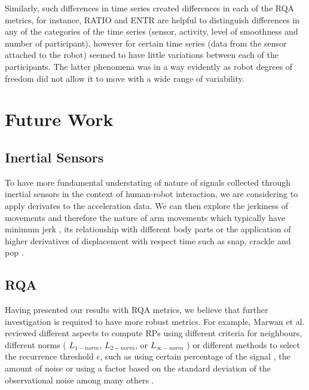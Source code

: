 %
%

Similarly, such differences in time series created differences in each of the 
RQA metrics, for instance, RATIO and ENTR are helpful to distinguish 
differences in any of the categories of the time series (sensor, activity, 
level of smoothness and number of participant), however for certain time series 
(data from the sensor attached to the robot) seemed to have little variations 
between each of the participants. The latter phenomena was in a way evidently
as robot degrees of freedom did not allow it to move with a wide range of variability. 





\section{Future Work}

\subsection{Inertial Sensors}
To have more fundamental understating of nature of signals collected through 
inertial sensors in the context of human-robot interaction, we are considering to apply 
derivates to the acceleration data. We can then explore the jerkiness of movements 
and therefore the nature of arm movements which typically have minimum jerk \cite{flash1985},
its relationship with different body parts \cite{devries1982, mori2012} or
the application of higher derivatives of displacement with respect time 
such as snap, crackle and pop \cite{eager2016}.



\subsection{RQA}
Having presented our results with RQA metrics, we believe that further investigation 
is required to have more robust metrics. For example, Marwan et al. \cite{marwan2007, marwan2015} 
reviewed different aspects to compute RPs using different criteria for neighbours, 
different norms ( $L_{1-norm}$, $L_{2-norm}$, or $L_{\infty-norm}$ ) or 
different methods to select the recurrence threshold $\epsilon$, such as using certain percentage 
of the signal \cite{letellier2006}, the amount of noise or using a factor based 
on the standard deviation of the observational noise among many others \cite{marwan2007}.











